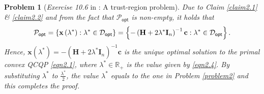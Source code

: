 \documentclass[11pt]{article}
\newtheorem{problem}{Problem}
\numberwithin{equation}{problem}
\begin{document}
\begin{problem} [\emph{Exercise 10.6} in \cite{calafiore2014optimization}: A trust-region problem]
{\indent Due to Claim \ref{claim2.1} \& \ref{claim2.2} and from the fact that $\mathcal{P}_{\textsf{opt}}$ is non-empty, it holds that
\begin{equation}
    \label{eqn2.9}
    \mathcal{P}_{\textnormal{\textsf{opt}}} = \left\{ \mathbf{x} \left( \lambda^* \right) : \lambda^* \in \mathcal{D}_{\textnormal{\textsf{opt}}} \right\}
    = \left\{ - \left( \mathbf{H} + 2 \lambda^* \mathbf{I}_n \right)^{-1} \mathbf{c} : \lambda^* \in \mathcal{D}_{\textnormal{\textsf{opt}}} \right\}.
\end{equation}
Hence, $\mathbf{x} \left( \lambda^* \right) = - \left( \mathbf{H} + 2 \lambda^* \mathbf{I}_n \right)^{-1} \mathbf{c}$ is the unique optimal solution to the primal convex QCQP \eqref{eqn2.1}, where $\lambda^* \in \mathbb{R}_{+}$ is the value given by \eqref{eqn2.4}. By substituting $\lambda^*$ to $\frac{\lambda^*}{2}$, the value $\lambda^*$ equals to the one in Problem \ref{problem2} and this completes the proof.
}
\end{problem}
\end{document}
